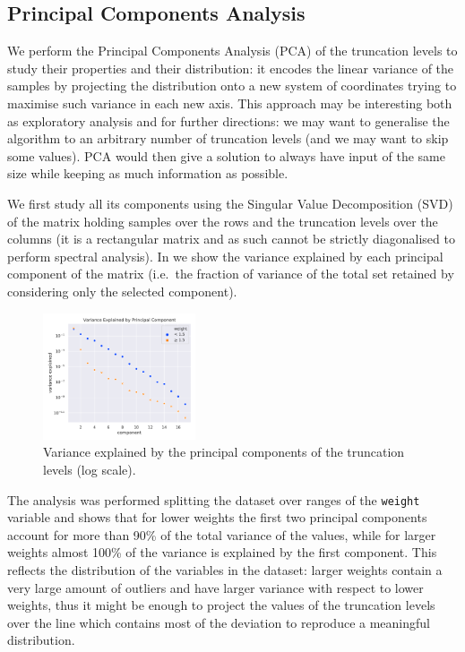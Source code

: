 \subsection{Principal Components Analysis}\label{sec:eda:pca}

We perform the Principal Components Analysis (PCA) of the truncation levels to
study their properties and their distribution: it encodes the linear variance
of the samples by projecting the distribution onto a new system of coordinates
trying to maximise such variance in each new axis.
This approach may be interesting both as exploratory analysis and for further
directions: we may want to generalise the algorithm to an arbitrary number of
truncation levels (and we may want to skip some values).
PCA would then give a solution to always have input of the same size while
keeping as much information as possible.

We first study all its components using the Singular Value Decomposition (SVD)
of the matrix holding samples over the rows and the truncation levels over the
columns (it is a rectangular matrix and as such cannot be strictly diagonalised
to perform spectral analysis).
In  we show the variance explained by each principal
component of the matrix (i.e.\ the fraction of variance of the total set
retained by considering only the selected component).
\begin{figure}[htbp]
  \centering
  \includegraphics[width=0.4\textwidth]{img/pca-variance-explained}
  \caption{Variance explained by the principal components of the truncation levels (log scale).}
  \label{fig:eda:pca}
\end{figure}

The analysis was performed splitting the dataset over ranges of the
\texttt{weight} variable and shows that for lower weights the first two
principal components account for more than 90\% of the total variance of the
values, while for larger weights almost 100\% of the variance is explained by
the first component.
This reflects the distribution of the variables in the dataset: larger weights
contain a very large amount of outliers and have larger variance with respect
to lower weights, thus it might be enough to project the values of the
truncation levels over the line which contains most of the deviation to
reproduce a meaningful distribution.

